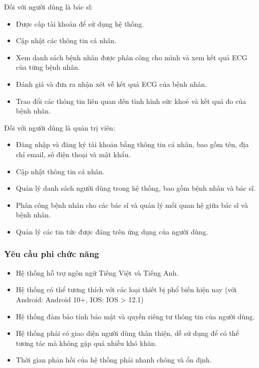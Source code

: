 \documentclass{article}%
\begin{document}
Đối với người dùng là bác sĩ:

\begin{itemize}
    \item Được cấp tài khoản để sử dụng hệ thống.
    \item Cập nhật các thông tin cá nhân.
    \item Xem danh sách bệnh nhân được phân công cho mình và xem kết quả ECG của từng bệnh nhân.
    \item Đánh giá và đưa ra nhận xét về kết quả ECG của bệnh nhân.
    \item Trao đổi các thông tin liên quan đến tình hình sức khoẻ và kết quả đo của bệnh nhân.
\end{itemize}

Đối với người dùng là quản trị viên:
\begin{itemize}
    \item Đăng nhập và đăng ký tài khoản bằng thông tin cá nhân, bao gồm tên, địa chỉ email, số điện thoại và mật khẩu.
    \item Cập nhật thông tin cá nhân.
    \item Quản lý danh sách người dùng trong hệ thống, bao gồm bệnh nhân và bác sĩ.
    \item Phân công bệnh nhân cho các bác sĩ và quản lý mối quan hệ giữa bác sĩ và bệnh nhân.
    \item Quản lý các tin tức được đăng trên ứng dụng của người dùng.
\end{itemize}

\subsubsection{Yêu cầu phi chức năng}
\begin{itemize}
    \item Hệ thống hỗ trợ ngôn ngữ Tiếng Việt và Tiếng Anh.
    \item Hệ thống có thể tương thích với các loại thiết bị phổ biến hiện nay (với Android: Android 10+, IOS: IOS > 12.1)
    \item Hệ thống đảm bảo tính bảo mật và quyền riêng tư thông tin của người dùng.
    \item Hệ thống phải có giao diện người dùng thân thiện, dễ sử dụng để có thể tương tác mà không gặp quá nhiều khó khăn.
    \item Thời gian phản hồi của hệ thống phải nhanh chóng và ổn định.
\end{itemize}
\end{document}
